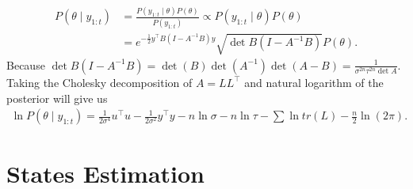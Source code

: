 \begin{align*}
P(\theta \mid  y_{1:t}) &= \frac{P(y_{1:t}\mid \theta)P(\theta) }{P(y_{1:t})}\propto P(y_{1:t}\mid \theta)P(\theta) \\
&=e^{-\frac{1}{2}y^\top B(I-A^{-1}B)y} \sqrt{\det B(I-A^{-1}B)} P(\theta).
\end{align*}
Because $\det B(I-A^{-1}B)=\det(B)\det(A^{-1})\det(A-B)=\frac{1}{\sigma^{2n}\tau^{2n} \det A}$. Taking the Cholesky decomposition of $A=LL^\top$ and natural logarithm of the posterior will give us
\begin{align*}
\ln P(\theta \mid  y_{1:t}) = \frac{1}{2\sigma^4}u^\top u - \frac{1}{2\sigma^2}y^\top y - n\ln\sigma-n\ln\tau-\sum\ln tr(L)-\frac{n}{2}\ln(2\pi).
\end{align*}


\section{States Estimation}

